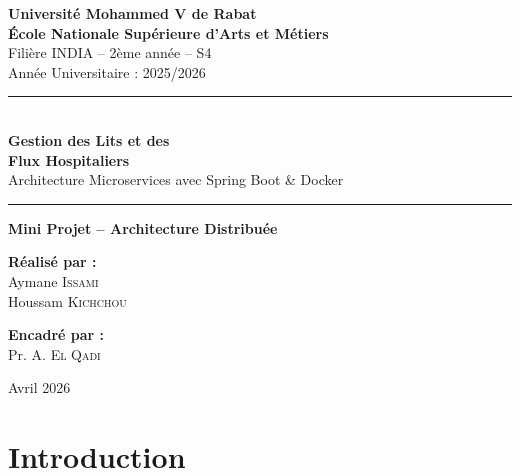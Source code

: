 \documentclass[12pt,a4paper]{report}
\begin{document}
\begin{titlepage}
    \centering
    \vspace*{1cm}

    {\Large\textbf{Universit\'e Mohammed V de Rabat}}\\[0.3cm]
    {\large\textbf{\'Ecole Nationale Sup\'erieure d'Arts et M\'etiers}}\\[0.2cm]
    {\normalsize Fili\`ere INDIA -- 2\`eme ann\'ee -- S4}\\[0.2cm]
    {\normalsize Ann\'ee Universitaire : 2025/2026}

    \vspace{1.5cm}
    \rule{\textwidth}{1.5pt}\\[0.5cm]
    {\Huge\textbf{Gestion des Lits et des\\[0.3cm] Flux Hospitaliers}}\\[0.5cm]
    {\Large Architecture Microservices avec Spring Boot \& Docker}\\[0.3cm]
    \rule{\textwidth}{1.5pt}

    \vspace{1.5cm}
    {\large\textbf{Mini Projet -- Architecture Distribu\'ee}}

    \vspace{2cm}

    \begin{minipage}{0.45\textwidth}
        \centering
        {\large\textbf{R\'ealis\'e par :}}\\[0.5cm]
        {\large Aymane \textsc{Issami}}\\[0.2cm]
        {\large Houssam \textsc{Kichchou}}
    \end{minipage}
    \hfill
    \begin{minipage}{0.45\textwidth}
        \centering
        {\large\textbf{Encadr\'e par :}}\\[0.5cm]
        {\large Pr. A. \textsc{El Qadi}}
    \end{minipage}

    \vfill
    {\large Avril 2026}
\end{titlepage}

\tableofcontents
\newpage

\chapter{Introduction}
\end{document}
